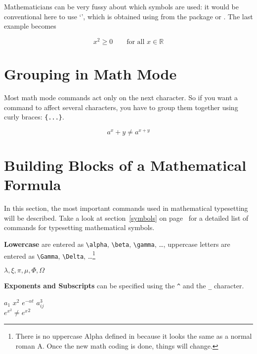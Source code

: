 %
%
Mathematicians can be very fussy about which symbols are used:
it would be conventional here to use `',
 which is obtained using  from the
package  or .
\ifx\mathbb\undefined\else
The last example becomes
\begin{example}
\begin{displaymath}
x^{2} \geq 0\qquad
\textrm{for all }x\in\mathbb{R}
\end{displaymath}
\end{example}
\fi

\section{Grouping in Math Mode}

Most math mode commands act only on the next character. So if you
want a command to affect several characters, you have to group them
together using curly braces: \verb|{...}|.
\begin{example}
\begin{equation}
a^x+y \neq a^{x+y}
\end{equation}
\end{example}
 
\section{Building Blocks of a Mathematical Formula}

In this section, the most important commands used in mathematical
typesetting will be described. Take a look at section~\ref{symbols} on
page~\pageref{symbols} for a detailed list of commands for typesetting
mathematical symbols.

\textbf{Lowercase } are entered as \verb|\alpha|,
 \verb|\beta|, \verb|\gamma|, \ldots, uppercase letters
are entered as \verb|\Gamma|, \verb|\Delta|, \ldots\footnote{There is no
  uppercase Alpha defined in \LaTeXe{} because it looks the same as a
  normal roman A. Once the new math coding is done, things will
  change.} 
\begin{example}
$\lambda,\xi,\pi,\mu,\Phi,\Omega$
\end{example}
\enlargethispage{\baselineskip}
\pagebreak[4]

\textbf{Exponents and Subscripts} can be specified using
the \verb|^| and the \verb|_| character.
\begin{example}
$a_{1}$ \qquad $x^{2}$ \qquad
$e^{-\alpha t}$ \qquad
$a^{3}_{ij}$\\
$e^{x^2} \neq {e^x}^2$
\end{example}

